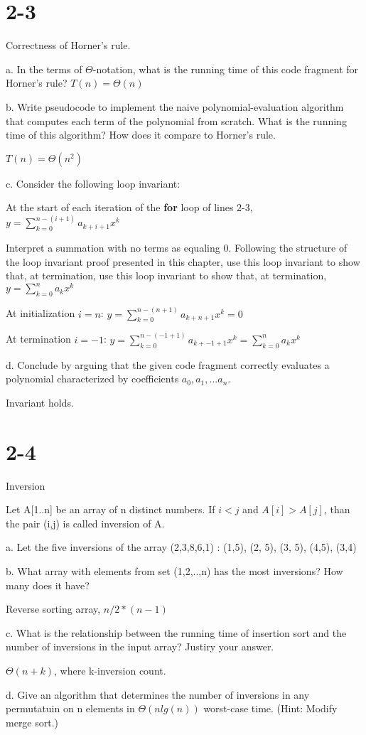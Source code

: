 \documentclass{article}
\begin{document}
\section{2-3}
Correctness of Horner's rule.

a. In the terms of $\Theta$-notation, what is the running time of this code fragment for Horner's rule?
$T(n)=\Theta(n)$

b. Write pseudocode to implement the naive polynomial-evaluation algorithm that computes each term of the polynomial from scratch. What is the running time of this algorithm? How does it compare to Horner's rule.


$T(n)=\Theta(n^2)$

c. Consider the following loop invariant:

At the start of each iteration of the \textbf{for} loop of lines 2-3, $y=\sum\limits_{k=0}^{n-(i+1)} a_{k+i+1}x^k$

Interpret a summation with no terms as equaling 0. Following the structure of the loop invariant proof presented in this chapter, use this loop invariant to show that, at termination, use this loop invariant to show that, at termination, $y=\sum\limits_{k=0}^{n} a_{k}x^k$

At initialization $i=n$: $y=\sum\limits_{k=0}^{n-(n+1)} a_{k+n+1}x^k = 0$

At termination $i=-1$:  $y=\sum\limits_{k=0}^{n-(-1+1)} a_{k+-1+1}x^k = \sum\limits_{k=0}^{n} a_{k}x^k$

d. Conclude by arguing that the given code fragment correctly evaluates a polynomial characterized by coefficients $a_0, a_1,...a_n$.

Invariant holds.

\section{2-4}

Inversion

Let A[1..n] be an array of n distinct numbers. If $ i < j$ and $A[i] > A[j]$, than the pair (i,j) is called inversion of A.

a. Let the five inversions of the array (2,3,8,6,1) : (1,5), (2, 5), (3, 5), (4,5), (3,4)

b. What array with elements from set (1,2,..,n) has the most inversions? How many does it have?

Reverse sorting array, 
$n/2*(n-1)$

c. What is the relationship between the running time of insertion sort and the number of inversions in the input array? Justiry your answer.

$\Theta(n+k)$, where k-inversion count.

d. Give an algorithm that determines the number of inversions in any permutatuin on n elements in $\Theta(n lg(n))$ worst-case time. (Hint: Modify merge sort.)

\end{document}
